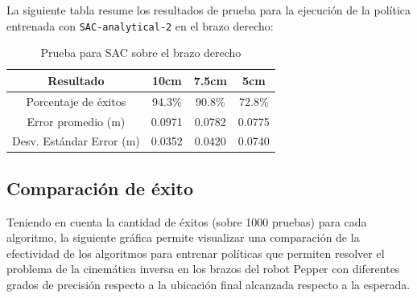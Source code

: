 La siguiente tabla resume los resultados de prueba para la ejecución de la política entrenada con \texttt{SAC-analytical-2} en el brazo derecho:

\begin{table}[h!]
	\centering
	\caption{Prueba para SAC sobre el brazo derecho}
	\label{tab:best-sac-right}
	\begin{tabular}{|c|c|c|c|}
		\hline
		\textbf{Resultado} & \textbf{10cm} & \textbf{7.5cm} & \textbf{5cm} \\
		\hline
		Porcentaje de éxitos & 94.3\% & 90.8\% & 72.8\% \\
		\hline
		Error promedio (m) & 0.0971 & 0.0782 & 0.0775 \\
		\hline
		Desv. Estándar Error (m) & 0.0352 & 0.0420 & 0.0740\\
		\hline
	\end{tabular}
\end{table}

\subsection{Comparación de éxito}

Teniendo en cuenta la cantidad de éxitos (sobre 1000 pruebas) para cada algoritmo, la siguiente gráfica permite visualizar una comparación de la efectividad de los algoritmos para entrenar políticas que permiten resolver el problema de la cinemática inversa en los brazos del robot Pepper con diferentes grados de precisión respecto a la ubicación final alcanzada respecto a la esperada.

